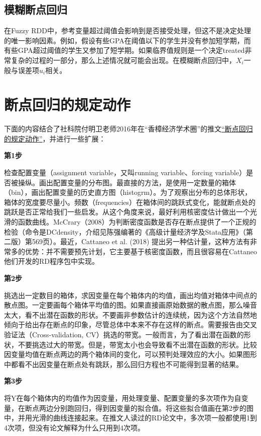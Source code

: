 \documentclass[cn,12pt,math=newtx,citestyle=gb7714-2015,bibstyle=gb7714-2015]{elegantbook}
\begin{document}
	
	\subsection{模糊断点回归}
	
	在Fuzzy RDD中，参考变量超过阈值会影响到是否接受处理，但这不是决定处理的唯一影响因素。例如，假设有些GPA在阈值以下的学生并没有参加短学期，而有些GPA超过阈值的学生又参加了短学期。如果临界值规则是一个决定treated非常复杂的过程的一部分，那么上述情况就可能会出现。在模糊断点回归中，$X_i$一般与误差项$u_i$相关。
	
	\section{断点回归的规定动作}
	
	下面的内容结合了社科院付明卫老师2016年在“香樟经济学术圈”的推文\href{https://cec.blog.caixin.com/archives/193848}{“断点回归的规定动作”}，并进行一些扩展：
	
	\textbf{第1步}
	
	检查配置变量（assignment variable，又叫running variable、forcing variable）是否被操纵。画出配置变量的分布图。最直接的方法，是使用一定数量的箱体（bin），画出配置变量的历史直方图（histogrm）。为了观察出分布的总体形状，箱体的宽度要尽量小。频数（frequencies）在箱体间的跳跃式变化，能就断点处的跳跃是否正常给我们一些启发。从这个角度来说，最好利用核密度估计做出一个光滑的函数曲线。McCrary（2008）为判断密度函数是否存在断点提供了一个正规的检验（命令是DCdensity，介绍见陈强编著的《高级计量经济学及Stata应用》（第二版）第569页）。最近，Cattaneo et al. (2018) 提出另一种估计量，这种方法有非常多的优势：并不需要预先计划，它主要基于核密度函数，而且很容易在Cattaneo他们开发的RD程序包中实现。
	
	\textbf{第2步}
	
	挑选出一定数目的箱体，求因变量在每个箱体内的均值，画出均值对箱体中间点的散点图。一定要画每个箱体平均值的图。如果直接画原始数据的散点图，那么噪音太大，看不出潜在函数的形状。不要画非参数估计的连续统，因为这个方法自然地倾向于给出存在断点的印象，尽管总体中本来不存在这样的断点。需要报告由交叉验证法（Cross-validation, CV）挑选的带宽。一般而言，为了看出潜在函数的形状，不要挑选过大的带宽。但是，带宽太小也会导致看不出潜在函数的形状。比较因变量均值在断点两边的两个箱体间的变化，可以预判处理效应的大小。如果图形中都看不出因变量在断点处有跳跃，那么回归方程也不可能得到显著的结果。
	
	\textbf{第3步}
	
	将Y在每个箱体内的均值作为因变量，用处理变量、配置变量的多次项作为自变量，在断点两边分别跑回归，得到因变量的拟合值。将这些拟合值画在第2步的图中，并用光滑的曲线连接起来。在推文人读过的RD论文中，多次项一般都使用1到4次项，但没有论文解释为什么只用到4次项。
	
\end{document}
